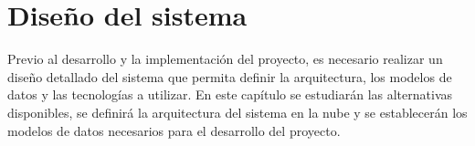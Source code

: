 \chapter{Diseño del sistema}\label{chap:diseño}
Previo al desarrollo y la implementación del proyecto, es necesario realizar un
diseño detallado del sistema que permita definir la arquitectura, los modelos de
datos y las tecnologías a utilizar. En este capítulo se estudiarán las
alternativas disponibles, se definirá la arquitectura del sistema en la nube y
se establecerán los modelos de datos necesarios para el desarrollo del proyecto.




\newpage{}


\newpage{}

